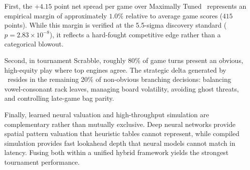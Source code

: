 First, the $+4.15$ point net spread per game over Maximally Tuned \magpie\ represents an empirical margin of approximately $1.0\%$ relative to average game scores ($415$ points). While this margin is verified at the 5.5-sigma discovery standard ($p = 2.83 \times 10^{-8}$), it reflects a hard-fought competitive edge rather than a categorical blowout.

Second, in tournament Scrabble, roughly 80\% of game turns present an obvious, high-equity play where top engines agree. The strategic delta generated by \algo\ resides in the remaining 20\% of non-obvious branching decisions: balancing vowel-consonant rack leaves, managing board volatility, avoiding ghost threats, and controlling late-game bag parity.

Finally, learned neural valuation and high-throughput simulation are complementary rather than mutually exclusive. Deep neural networks provide spatial pattern valuation that heuristic tables cannot represent, while compiled simulation provides fast lookahead depth that neural models cannot match in latency. Fusing both within a unified hybrid framework yields the strongest tournament performance.
